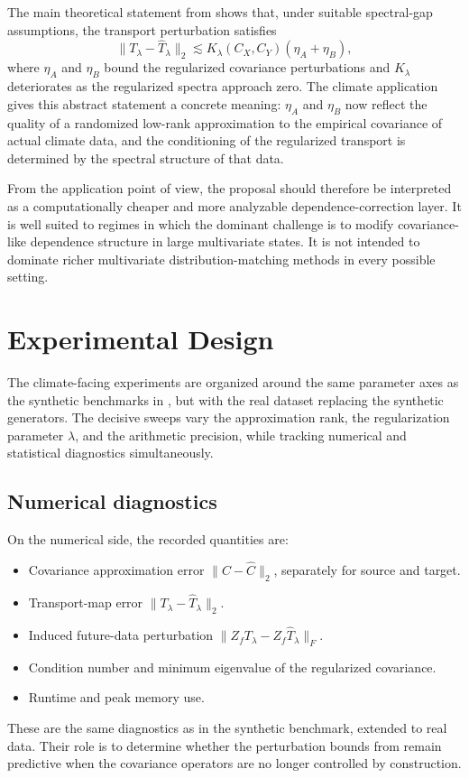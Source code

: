 The main theoretical statement from
 shows that, under suitable spectral-gap assumptions,
the transport perturbation satisfies
\[
	\|T_\lambda - \widehat T_\lambda\|_2
	\lesssim
	K_\lambda(C_X, C_Y)(\eta_A + \eta_B),
\]
where \(\eta_A\) and \(\eta_B\) bound the regularized covariance perturbations and
\(K_\lambda\) deteriorates as the regularized spectra approach zero. The climate
application gives this abstract statement a concrete meaning: \(\eta_A\) and
\(\eta_B\) now reflect the quality of a randomized low-rank approximation to the
empirical covariance of actual climate data, and the conditioning of the regularized
transport is determined by the spectral structure of that data.

From the application point of view, the proposal should therefore be interpreted as
a computationally cheaper and more analyzable dependence-correction layer. It is
well suited to regimes in which the dominant challenge is to modify covariance-like
dependence structure in large multivariate states. It is not intended to dominate
richer multivariate distribution-matching methods in every possible setting.

\section{Experimental Design}

The climate-facing experiments are organized around the same parameter axes as the
synthetic benchmarks in , but with the real dataset replacing
the synthetic generators. The decisive sweeps vary the approximation rank,
the regularization parameter \(\lambda\), and the arithmetic precision, while
tracking numerical and statistical diagnostics simultaneously.

\subsection{Numerical diagnostics}

On the numerical side, the recorded quantities are:
\begin{itemize}
	\item Covariance approximation error
	      \(\|C - \widehat C\|_2\), separately for source and target.
	\item Transport-map error
	      \(\|T_\lambda - \widehat T_\lambda\|_2\).
	\item Induced future-data perturbation
	      \(\|Z_f T_\lambda - Z_f \widehat T_\lambda\|_F\).
	\item Condition number and minimum eigenvalue of the regularized covariance.
	\item Runtime and peak memory use.
\end{itemize}
These are the same diagnostics as in the synthetic benchmark, extended to real
data. Their role is to determine whether the perturbation bounds from
 remain predictive when the covariance operators are
no longer controlled by construction.

